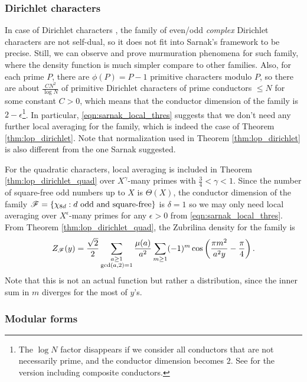 \subsubsection{Dirichlet characters}

In case of Dirichlet characters \cite{lee2025murmurations}, the family of even/odd \emph{complex} Dirichlet characters are not self-dual, so it does not fit into Sarnak's framework to be precise.
Still, we can observe and prove murmuration phenomena for such family, where the density function is much simpler compare to other families.
Also, for each prime $P$, there are $\phi(P) = P-1$ primitive characters modulo $P$, so there are about $\frac{CN^2}{\log N}$ of primitive Dirichlet characters of prime conductors $\le N$ for some constant $C > 0$, which means that the conductor dimension of the family is $2-\epsilon$\footnote{The $\log N$ factor disappears if we consider all conductors that are not necessarily prime, and the conductor dimension becomes $2$. See \cite[Section 6]{lee2025murmurations} for the version including composite conductors.}.
In particular, \eqref{eqn:sarnak_local_thres} suggests that we don't need any further local averaging for the family, which is indeed the case of Theorem \ref{thm:lop_dirichlet}.
Note that normalization used in Theorem \ref{thm:lop_dirichlet} is also different from the one Sarnak suggested.

For the quadratic characters, local averaging is included in Theorem \ref{thm:lop_dirichlet_quad} over $X^{\gamma}$-many primes with $\frac{3}{4} < \gamma < 1$.
Since the number of square-free odd numbers up to $X$ is $\Theta(X)$, the conductor dimension of the family $\mathscr{F} = \{\chi_{8d} : d\text{ odd and square-free}\}$ is $\delta = 1$ so we may only need local averaging over $X^{\epsilon}$-many primes for any $\epsilon > 0$ from \eqref{eqn:sarnak_local_thres}.
From Theorem \ref{thm:lop_dirichlet_quad}, the Zubrilina density for the family is
\begin{equation}
    Z_{\mathscr{F}}(y) = \frac{\sqrt{2}}{2} \sum_{\substack{a \ge 1 \\ \gcd(a, 2) = 1}} \frac{\mu(a)}{a^2} \sum_{m \ge 1} (-1)^m \cos\left(\frac{\pi m^2}{a^2 y} - \frac{\pi}{4}\right).
\end{equation}
Note that this is not an actual function but rather a distribution, since the inner sum in $m$ diverges for the most of $y$'s.

\subsubsection{Modular forms}

